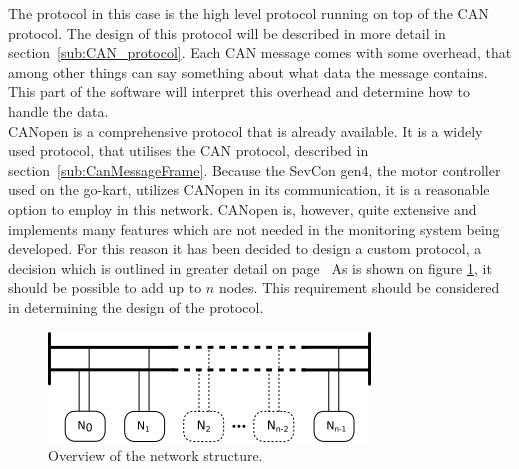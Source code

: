 The protocol in this case is the high level protocol running on top of the CAN protocol.
The design of this protocol will be described in more detail in section~\ref{sub:CAN_protocol}. 
Each CAN message comes with some overhead, that among other things can say something about what data the message contains.
This part of the software will interpret this overhead and determine how to handle the data.\\

CANopen is a comprehensive protocol that is already available.
It is a widely used protocol, that utilises the CAN protocol, described in section~\ref{sub:CanMessageFrame}.
Because the SevCon gen4, the motor controller used on the go-kart, utilizes CANopen in its communication, it is a reasonable option to employ in this network.
CANopen is, however, quite extensive and implements many features which are not needed in the monitoring system being developed.
For this reason it has been decided to design a custom protocol, a decision which is outlined in greater detail on page~\pageref{sub:CANopen}
As is shown on figure \ref{fig:analysisnodes}, it should be possible to add up to $n$ nodes.
This requirement should be considered in determining the design of the protocol.

\begin{figure}
	\centering
	\includegraphics[width=.75\linewidth]{graphics/analysis_nodes}
	\caption{Overview of the network structure.}
	\label{fig:analysisnodes}
\end{figure}

